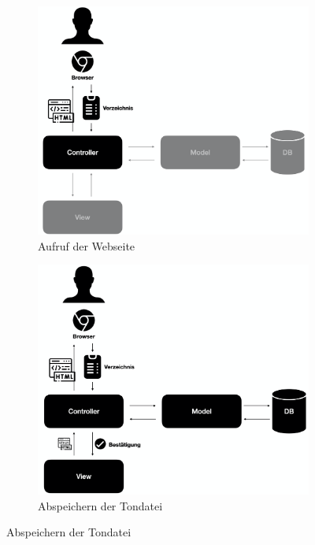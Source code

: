 \begin{figure}
	\centering
	\begin{subfigure}[a]{0.4\linewidth}
		\includegraphics[width=\linewidth]{Assets/PluraPolit-Softwaresystem.001}
		\caption{Aufruf der Webseite}
		\label{fig:plurapolit-call-webpage}
	\end{subfigure}
	\begin{subfigure}[a]{0.4\linewidth}
		\includegraphics[width=\linewidth]{Assets/PluraPolit-Softwaresystem.002}
		\caption{Abspeichern der Tondatei}	

\end{subfigure}
\end{figure}
